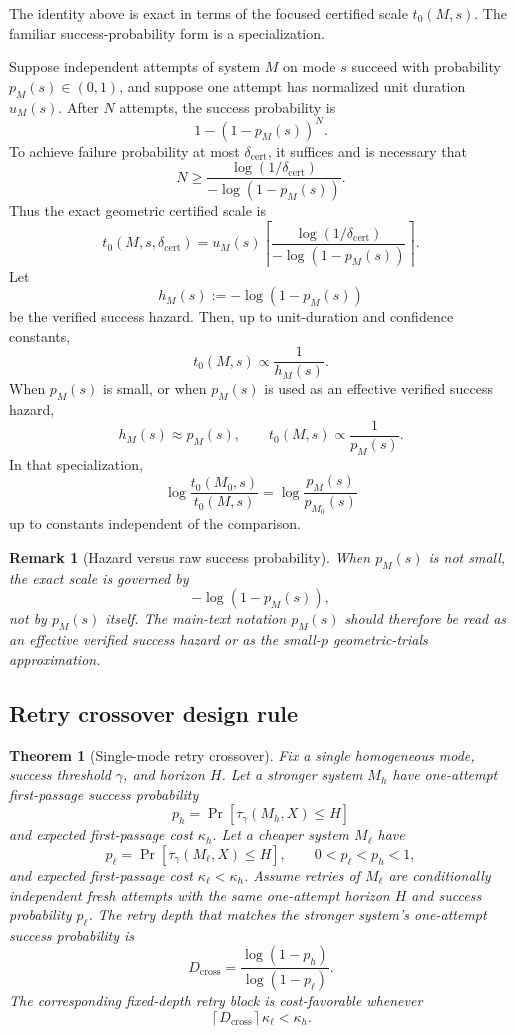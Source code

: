 \documentclass{article}
\newtheorem{theorem}{Theorem}
\newtheorem{remark}{Remark}
\begin{document}
The identity above is exact in terms of the focused certified scale \(t_0(M,s)\).
The familiar success-probability form is a specialization.

Suppose independent attempts of system \(M\) on mode \(s\) succeed with probability
\(p_M(s)\in(0,1)\), and suppose one attempt has normalized unit duration \(u_M(s)\).
After \(N\) attempts, the success probability is
\[
    1-(1-p_M(s))^N.
\]
To achieve failure probability at most \(\delta_{\mathrm{cert}}\), it suffices and is necessary that
\[
    N
    \ge
    \frac{\log(1/\delta_{\mathrm{cert}})}
         {-\log(1-p_M(s))}.
\]
Thus the exact geometric certified scale is
\[
    t_0(M,s,\delta_{\mathrm{cert}})
    =
    u_M(s)
    \left\lceil
    \frac{\log(1/\delta_{\mathrm{cert}})}
         {-\log(1-p_M(s))}
    \right\rceil.
\]
Let
\[
    h_M(s):=-\log(1-p_M(s))
\]
be the verified success hazard.  Then, up to unit-duration and confidence constants,
\[
    t_0(M,s)\propto \frac{1}{h_M(s)}.
\]
When \(p_M(s)\) is small, or when \(p_M(s)\) is used as an effective verified success
hazard,
\[
    h_M(s)\approx p_M(s),
    \qquad
    t_0(M,s)\propto\frac{1}{p_M(s)}.
\]
In that specialization,
\[
    \log\frac{t_0(M_0,s)}{t_0(M,s)}
    =
    \log\frac{p_M(s)}{p_{M_0}(s)}
\]
up to constants independent of the comparison.

\begin{remark}[Hazard versus raw success probability]
When \(p_M(s)\) is not small, the exact scale is governed by
\[
    -\log(1-p_M(s)),
\]
not by \(p_M(s)\) itself.  The main-text notation \(p_M(s)\) should therefore be read
as an effective verified success hazard or as the small-\(p\) geometric-trials approximation.
\end{remark}

\subsection{Retry crossover design rule}
\label{app:retry-crossover}

\begin{theorem}[Single-mode retry crossover]
\label{thm:crossover}
Fix a single homogeneous mode, success threshold \(\gamma\), and horizon \(H\).
Let a stronger system \(M_h\) have one-attempt first-passage success probability
\[
    p_h=\Pr[\tau_\gamma(M_h,X)\le H]
\]
and expected first-passage cost \(\kappa_h\).  Let a cheaper system \(M_\ell\) have
\[
    p_\ell=\Pr[\tau_\gamma(M_\ell,X)\le H],
    \qquad
    0<p_\ell<p_h<1,
\]
and expected first-passage cost \(\kappa_\ell<\kappa_h\).
Assume retries of \(M_\ell\) are conditionally independent fresh attempts with the same
one-attempt horizon \(H\) and success probability \(p_\ell\).  The retry depth that matches
the stronger system's one-attempt success probability is
\[
    D_{\mathrm{cross}}
    =
    \frac{\log(1-p_h)}{\log(1-p_\ell)}.
\]
The corresponding fixed-depth retry block is cost-favorable whenever
\[
    \left\lceil D_{\mathrm{cross}}\right\rceil\kappa_\ell < \kappa_h .
\]
\end{theorem}
\end{document}
